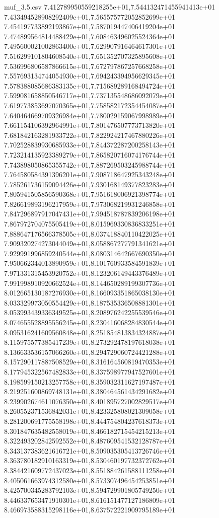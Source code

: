 \begin{filecontents*}{muf_3.5.csv}
7.412789950559218255e+01,7.544132471455941413e+01
7.433494528908292409e+01,7.565575772052852699e+01
7.454197733892193867e+01,7.587019447406419204e+01
7.474899564814488429e+01,7.608463496025524364e+01
7.495600021002863400e+01,7.629907916464617301e+01
7.516299101804608540e+01,7.651352707325895608e+01
7.536996806587866615e+01,7.672797867257668258e+01
7.557693134744054930e+01,7.694243394956629345e+01
7.578388085686383135e+01,7.715689289168494724e+01
7.599081658850546717e+01,7.737135548686092079e+01
7.619773853697070365e+01,7.758582172354454087e+01
7.640464669709326984e+01,7.780029159067998989e+01
7.661154106392964991e+01,7.801476507773713820e+01
7.681842163281933722e+01,7.822924217467880226e+01
7.702528839930685933e+01,7.844372287200258143e+01
7.723214135923389279e+01,7.865820716074176744e+01
7.743898050865355742e+01,7.887269503245988744e+01
7.764580584391396201e+01,7.908718647925343248e+01
7.785261736159094426e+01,7.930168149377823283e+01
7.805941505856590368e+01,7.951618006921398774e+01
7.826619893196217959e+01,7.973068219931246858e+01
7.847296897917047431e+01,7.994518787839206198e+01
7.867972704075505419e+01,8.015969330836833251e+01
7.888647176566378505e+01,8.037418840110422025e+01
7.909320274273044049e+01,8.058867277791341621e+01
7.929991996859240544e+01,8.080314642667690350e+01
7.950662344013890959e+01,8.101760933584591839e+01
7.971331315453920752e+01,8.123206149443376489e+01
7.991998910920662524e+01,8.144650289199307736e+01
8.012665130187276930e+01,8.166093351865038130e+01
8.033329973050554429e+01,8.187535336508881301e+01
8.053993439336349525e+01,8.208976242255539546e+01
8.074655528895556245e+01,8.230416068284830544e+01
8.095316241609560848e+01,8.251854813834324887e+01
8.115975577385417239e+01,8.273292478197618038e+01
8.136633536157066260e+01,8.294729060724421288e+01
8.157290117887508529e+01,8.316164560819470353e+01
8.177945322567482833e+01,8.337598977947527601e+01
8.198599150213257758e+01,8.359032311627197487e+01
8.219251600869748131e+01,8.380464561434291682e+01
8.239902674611076350e+01,8.401895727002829517e+01
8.260552371536842031e+01,8.423325808021309058e+01
8.281200691775558198e+01,8.444754804237618373e+01
8.301847635482558019e+01,8.466182715454215213e+01
8.322493202842592552e+01,8.487609541532128787e+01
8.343137383621616721e+01,8.509035305413726746e+01
8.363780182910163319e+01,8.530460197732372762e+01
8.384421609772437023e+01,8.551884261588111258e+01
8.405061663974312580e+01,8.573307496454253851e+01
8.425700345283792103e+01,8.594729901805749250e+01
8.446337653471910301e+01,8.616151477127186809e+01
8.466973588315298116e+01,8.637572221909795189e+01

\end{filecontents*}
